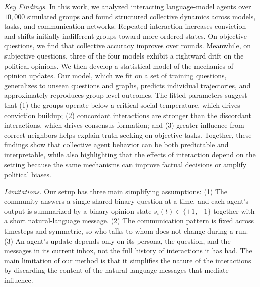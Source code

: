 \textit{Key Findings.} In this work, we analyzed interacting language-model agents over $10,000$ simulated groups and found structured collective dynamics across models, tasks, and communication networks. Repeated interaction increases conviction and shifts initially indifferent groups toward more ordered states. On objective questions, we find that collective accuracy improves over rounds. Meanwhile, on subjective questions, three of the four models exhibit a rightward drift on the political opinions. We then develop a statistical model of the mechanics of opinion updates. Our model, which we fit on a set of training questions, generalizes to unseen questions and graphs, predicts individual trajectories, and approximately reproduces group-level outcomes. The fitted parameters suggest that (1) the groups operate below a critical social temperature, which drives conviction buildup; (2) concordant interactions are stronger than the discordant interactions, which drives consensus formation; and (3) greater influence from correct neighbors helps explain truth-seeking on objective tasks. Together, these findings show that collective agent behavior can be both predictable and interpretable, while also highlighting that the effects of interaction depend on the setting because the same mechanisms can improve factual decisions or amplify political biases.

\textit{Limitations.} Our setup has three main simplifying assumptions: (1) The community answers a single shared binary question at a time, and each agent's output is summarized by a binary opinion state $s_i(t) \in \{+1,-1\}$ together with a short natural-language message. (2) The communication pattern is fixed across timesteps and symmetric, so who talks to whom does not change during a run. (3) An agent's update depends only on its persona, the question, and the messages in its current inbox, not the full history of interactions it has had. The main limitation of our method is that it simplifies the nature of the interactions by discarding the content of the natural-language messages that mediate influence.

